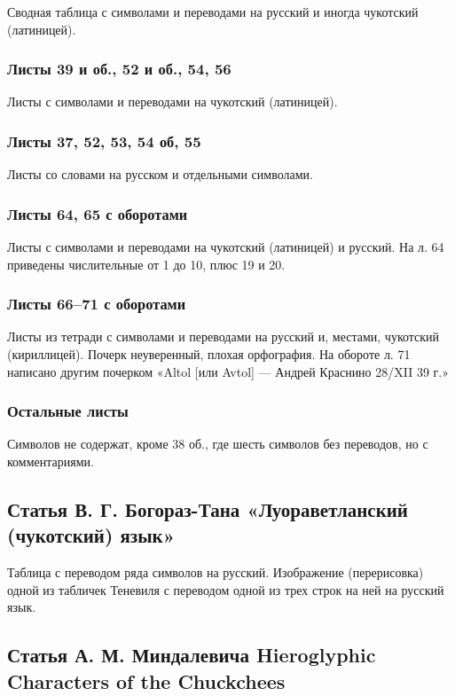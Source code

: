 \documentclass{article}
\newcounter{glyph}
\begin{document}
Сводная таблица с символами и переводами на русский и иногда чукотский (латиницей).

\subsubsection{Листы 39 и об., 52 и об., 54, 56}

Листы с символами и переводами на чукотский (латиницей).

\subsubsection{Листы 37, 52, 53, 54 об, 55}

Листы со словами на русском и отдельными символами.

\subsubsection{Листы 64, 65 с оборотами}

Листы с символами и переводами на чукотский (латиницей) и русский. На л. 64 приведены числительные от 1 до 10, плюс 19 и 20.

\subsubsection{Листы 66–71 с оборотами}

Листы из тетради с символами и переводами на русский и, местами, чукотский (кириллицей). Почерк неуверенный, плохая орфография. На обороте л. 71 написано другим почерком «Altol [или Avtol] — Андрей Краснино 28/XII 39 г.»

\subsubsection{Остальные листы}

Символов не содержат, кроме 38 об., где шесть символов без переводов, но с комментариями.

\subsection{Статья В. Г. Богораз-Тана «Луораветланский (чукотский) язык»}

Таблица с переводом ряда символов на русский. Изображение (перерисовка) одной из табличек Теневиля с переводом одной из трех строк на ней на русский язык.

\subsection{Статья А. М. Миндалевича Hieroglyphic Characters of the Chuckchees}
\end{document}
